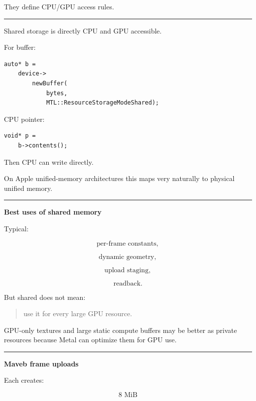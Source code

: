 They define CPU/GPU access rules.

\begin{center}\rule{0.5\linewidth}{0.5pt}\end{center}

\textbf{}

Shared storage is directly CPU and GPU accessible.

For buffer:

\begin{verbatim}
auto* b =
    device->
        newBuffer(
            bytes,
            MTL::ResourceStorageModeShared);
\end{verbatim}

CPU pointer:

\begin{verbatim}
void* p =
    b->contents();
\end{verbatim}

Then CPU can write directly.

On Apple unified-memory architectures this maps very naturally to physical unified memory.

\begin{center}\rule{0.5\linewidth}{0.5pt}\end{center}

\textbf{Best uses of shared memory}

Typical:

\[
\text{per-frame constants},
\]

\[
\text{dynamic geometry},
\]

\[
\text{upload staging},
\]

\[
\text{readback}.
\]

But shared does not mean:

\begin{quote}
use it for every large GPU resource.
\end{quote}

GPU-only textures and large static compute buffers may be better as private resources because Metal can optimize them for GPU use.

\begin{center}\rule{0.5\linewidth}{0.5pt}\end{center}

\textbf{Maveb frame uploads}

Each  creates:

\[
8\text{ MiB}
\]

